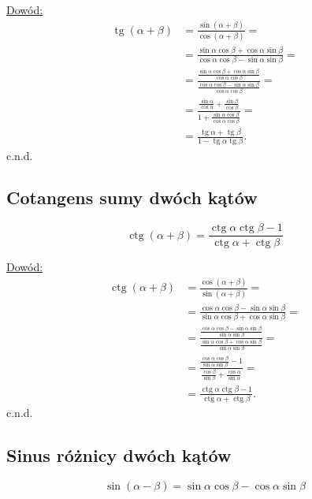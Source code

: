 \documentclass[12pt,a4paper,fleqn]{article}
\DeclareMathOperator{\tg}{tg}
\DeclareMathOperator{\ctg}{ctg}
\begin{document}
		\underline{Dowód:}\noindent
		\begin{align*}
			\tg (\alpha + \beta) &= \frac{\sin(\alpha + \beta)}{\cos(\alpha+\beta)} = \\
								 &= \frac{\sin\alpha\cos\beta + \cos\alpha\sin\beta}{\cos\alpha\cos\beta-\sin\alpha\sin\beta} =\\
								 &= \frac{\frac{\sin\alpha\cos\beta + \cos\alpha\sin\beta}{\cos\alpha\cos\beta}}
								 	{\frac{\cos\alpha\cos\beta-\sin\alpha\sin\beta}{\cos\alpha\cos\beta}} =\\
								 &=\frac{\frac{\sin\alpha}{\cos\alpha}+\frac{\sin\beta}{\cos\beta}}
								 	{1+\frac{\sin\alpha\cos\beta}{\cos\alpha\cos\beta}}=\\
								 &= \frac{\tg \alpha + \tg \beta}{1 - \tg \alpha \tg \beta}.
		\end{align*}
		c.n.d.
		
		\subsection{Cotangens sumy dwóch kątów}
		\begin{equation*}
			\ctg (\alpha + \beta) = \frac{\ctg\alpha\ctg\beta-1}{\ctg\alpha+\ctg\beta}
		\end{equation*}
		
		\underline{Dowód:}\noindent
		\begin{align*}
			\ctg (\alpha + \beta) &= \frac{\cos(\alpha+\beta)}{\sin(\alpha + \beta)} = \\
								  &= \frac{\cos\alpha\cos\beta-\sin\alpha\sin\beta}{\sin\alpha\cos\beta+\cos\alpha\sin\beta} =\\
								  &= \frac{\frac{\cos\alpha\cos\beta-\sin\alpha\sin\beta}{\sin\alpha\sin\beta}} {\frac{\sin\alpha\cos\beta+\cos\alpha\sin\beta}{\sin\alpha\sin \beta}} =\\
								  &=\frac{\frac{\cos\alpha\cos\beta}{\sin\alpha\sin\beta}-1}{\frac{\cos\beta}{\sin\beta}+\frac{\cos\alpha}{\sin\alpha}} = \\
								  &=\frac{\ctg\alpha\ctg\beta - 1}{\ctg\alpha+\ctg\beta}.
		\end{align*}
		c.n.d.
		
		\subsection{Sinus różnicy dwóch kątów}
		\begin{equation*}
			\sin(\alpha-\beta) = \sin\alpha\cos\beta-\cos\alpha\sin\beta
		\end{equation*}
		
\end{document}
